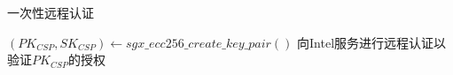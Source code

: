 \begin{algorithm}[h]
    \caption{一次性远程认证}
    $(PK_{CSP}, SK_{CSP}) \gets sgx\_ecc256\_create\_key\_pair()$\;
    向Intel服务进行远程认证以验证$PK_{CSP}$的授权\;
    \KwRet{}\;
\label{algo:attestation}
\end{algorithm} 